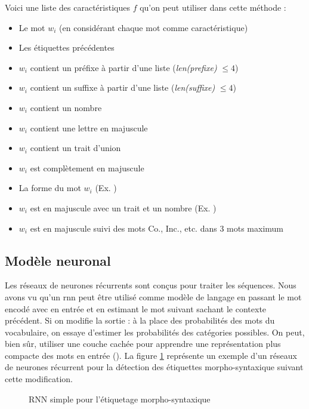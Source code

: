 \documentclass{KodeBook}
\begin{document}
Voici une liste des caractéristiques $f$ qu'on peut utiliser dans cette méthode :
\begin{itemize}
	\item Le mot $w_i$ (en considérant chaque mot comme caractéristique)
	\item Les étiquettes précédentes 
	\item $w_i$ contient un préfixe à partir d'une liste (\textit{len(prefixe)} $\le 4$) 
	\item $w_i$ contient un suffixe à partir d'une liste (\textit{len(suffixe)} $\le 4$) 
	\item $w_i$ contient un nombre 
	\item $w_i$ contient une lettre en majuscule
	\item $w_i$ contient un trait d'union 
	\item $w_i$ est complètement en majuscule
	\item La forme du mot $w_i$ (Ex. ) 
	\item $w_i$ est en majuscule avec un trait et un nombre (Ex. ) 
	\item $w_i$ est en majuscule suivi des mots Co., Inc., etc. dans 3 mots maximum
\end{itemize}

\subsection{Modèle neuronal}

Les réseaux de neurones récurrents sont conçus pour traiter les séquences.
Nous avons vu qu'un \ac{rnn} peut être utilisé comme modèle de langage en passant le mot encodé avec  en entrée et en estimant le mot suivant sachant le contexte précédent. 
Si on modifie la  sortie : à la place des probabilités des mots du vocabulaire, on essaye d'estimer les probabilités des catégories possibles. 
On peut, bien sûr, utiliser une couche cachée pour apprendre une représentation plus compacte des mots en entrée (). 
La figure \ref{fig:pos-rnn1} représente un exemple d'un réseaux de neurones récurrent pour la détection des étiquettes morpho-syntaxique suivant cette modification.
\begin{figure}[!ht]
	\centering
	\caption[RNN simple pour l'étiquetage morpho-syntaxique]{RNN simple pour l'étiquetage morpho-syntaxique \cite{2019-jurafsky-martin}\label{fig:pos-rnn1}}
\end{figure}
\end{document}
